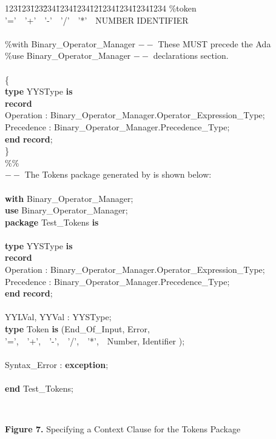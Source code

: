 \begin{tabbing}
123\=123\=123\=234\=1234\=1234\=12\=1234\=1234\=1234\=1234 \kill
\%token  '='\ \ '+'\ \ '-'\ \ '/'\ \ '*'\ \ NUMBER  IDENTIFIER\\
\\
\%with    Binary\_Operator\_Manager       $--$ These MUST precede the Ada\\
\%use     Binary\_Operator\_Manager       $--$ declarations section.\\
\\
\{\\
\>  {\bf type} YYSType {\bf is}\\
\>\>    {\bf record}\\
\>\>\>      Operation  : Binary\_Operator\_Manager.Operator\_Expression\_Type;\\
\>\>\>      Precedence : Binary\_Operator\_Manager.Precedence\_Type;\\
\>    {\bf end} {\bf record};\\
\}\\
\%\%\\
$--$ The Tokens package generated by \ayacc is shown below:\\
\\
{\bf with}  Binary\_Operator\_Manager;\\
{\bf use}   Binary\_Operator\_Manager;\\
{\bf package} Test\_Tokens {\bf is}\\
\\
\>  {\bf type} YYSType {\bf is}\\
\>\>    {\bf record}\\
\>\>\>      Operation  : Binary\_Operator\_Manager.Operator\_Expression\_Type;\\
\>\>\>      Precedence : Binary\_Operator\_Manager.Precedence\_Type;\\
\>\>    {\bf end} {\bf record};\\
\\
\>\>    YYLVal, YYVal : YYSType;\\
\>\>    {\bf type} Token {\bf is} (\>\>\>\>End\_Of\_Input, Error,\\
\>\>\>\>\>\>                   '=',\ \ '+',\ \ '-',\ \ '/',\ \ '*',\ \ Number, Identifier );\\
\\
\>\>    Syntax\_Error : {\bf exception};\\
\\
{\bf end} Test\_Tokens;\\
\end{tabbing}
\hspace{-0.05in}\hrulefill\hspace{0.0in}\\
\centerline{{\bf Figure 7.} Specifying a Context Clause for the Tokens Package}
\newpage

